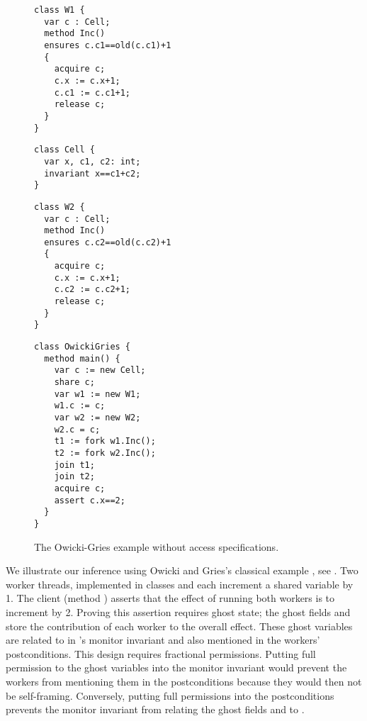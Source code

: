 \documentclass{llncs}
\begin{document}
\begin{figure}
\goup
\goup
\goup
\setlength{\columnseprule}{0.5pt}
\setlength{\columnsep}{20pt}
\begin{multicols}{3}
\begin{lstlisting}
class W1 {
  var c : Cell;
  method Inc()
  ensures c.c1==old(c.c1)+1
  {
    acquire c;
    c.x := c.x+1;
    c.c1 := c.c1+1;
    release c;
  }
}
\end{lstlisting}
\begin{lstlisting}[firstnumber=12]
class Cell {
  var x, c1, c2: int;
  invariant x==c1+c2;
}
\end{lstlisting}
\columnbreak
\begin{lstlisting}[firstnumber=16]
class W2 {
  var c : Cell;
  method Inc()
  ensures c.c2==old(c.c2)+1
  {
    acquire c;
    c.x := c.x+1;
    c.c2 := c.c2+1;
    release c;
  }
}
\end{lstlisting}
\columnbreak
\begin{lstlisting}[firstnumber=27]
class OwickiGries {
  method main() {
    var c := new Cell;
    share c;
    var w1 := new W1;
    w1.c := c;
    var w2 := new W2;
    w2.c = c;
    t1 := fork w1.Inc();
    t2 := fork w2.Inc();
    join t1;
    join t2;
    acquire c;
    assert c.x==2;
  }
}
\end{lstlisting}
\end{multicols}
\normalsize
\goup
\caption{The Owicki-Gries example without access specifications.}
\label{fig:runningexample}
\goup
\goup
\goup
\end{figure}

We illustrate our inference using Owicki and Gries's classical example
\cite{OG76}, see . Two worker threads,
implemented in classes  and  each increment
a shared variable  by 1. The client (method )
asserts that the effect of running both workers is to increment 
 by 2. Proving this assertion requires ghost state; the
ghost fields  and  store the contribution
of each worker to the overall effect. These ghost variables are related
to  in 's monitor invariant and also
mentioned in the workers' postconditions. This design requires fractional
permissions. Putting full permission to the ghost variables into the
monitor invariant would prevent the workers from mentioning them in
the postconditions because they would then not be self-framing. Conversely,
putting full permissions into the postconditions prevents the monitor
invariant from relating the ghost fields  and  to . 
\end{document}
